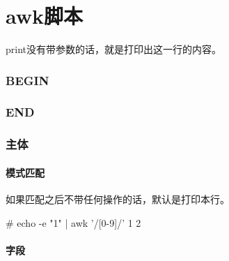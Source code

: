 \section{awk脚本}



print没有带参数的话，就是打印出这一行的内容。

\subsubsection*{BEGIN}

\subsubsection{END}

\subsubsection{主体}

\paragraph{模式匹配}

如果匹配之后不带任何操作的话，默认是打印本行。

\begin{Command-Line}
# echo -e "1" | awk '/[0-9]/'
1
2
\end{Command-Line}

\paragraph{字段}